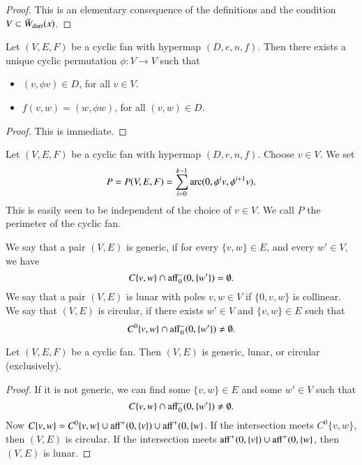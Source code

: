{{\begin{proof}  This is an elementary consequence of the definitions and the condition $V\subset \bar W_{\text{dart}}(x)$.
\end{proof}

\begin{lemma}  Let $(V,E,F)$ be a cyclic fan with hypermap $(D,e,n,f)$.  Then there exists a unique cyclic permutation $\phi:V\to V$ such that
\begin{itemize}
\item $(v,\phi v)\in D$, for all $v\in V$.
\item $f(v,w) = (w,\phi w)$, for all $(v,w)\in D$.
\end{itemize}
\end{lemma}

\begin{proof}  This is immediate.
\end{proof}

\begin{definition}[perimeter]\label{lemma:mono}
Let $(V,E,F)$ be a cyclic fan with hypermap $(D,e,n,f)$.  Choose $v\in V$.  We set
$$
P=P(V,E,F) = \sum_{i=0}^{k-1} \operatorname{arc}(0,\phi^i v,\phi^{i+1} v).
$$
This is easily seen to be independent of the choice of $v\in V$.  We call $P$ the perimeter of the cyclic fan.
\end{definition}

\begin{definition}
We say that a pair $(V,E)$ is generic, if for every $\{v,w\}\in E$,
and every $w'\in V$, we have
$$
C\{v,w\}\cap {\operatorname{aff}}_0^-(0,\{w'\}) = \emptyset.
$$
We say that a pair $(V,E)$ is lunar with poles $v,w\in V$ if $\{0,v,w\}$ is collinear.
We say that $(V,E)$ is circular, if there exists $w'\in V$ and $\{v,w\}\in E$ such that 
$$
C^0\{v,w\}\cap {\operatorname{aff}}_0^-(0,\{w'\})\ne \emptyset.
$$
\end{definition}

\begin{lemma} Let $(V,E,F)$ be a cyclic fan.  Then $(V,E)$ is
generic, lunar, or circular (exclusively).
\end{lemma}

\begin{proof} If it is not generic, we can find some $\{v,w\}\in E$
and some $w'\in V$ such that
$$
C\{v,w\}\cap {\operatorname{aff}}_0^-(0,\{w'\}) \ne \emptyset.
$$
Now $C\{v,w\} = C^0\{v,w\} \cup{\operatorname{aff}}^+(0,\{v\})\cup{\operatorname{aff}}^+(0,\{w\}$.  
If the intersection meets $C^0\{v,w\}$, then $(V,E)$ is circular.  
If the intersection meets ${\operatorname{aff}}^+(0,\{v\})\cup{\operatorname{aff}}^+(0,\{w\}$,
then $(V,E)$ is lunar. 
\end{proof}

}}
